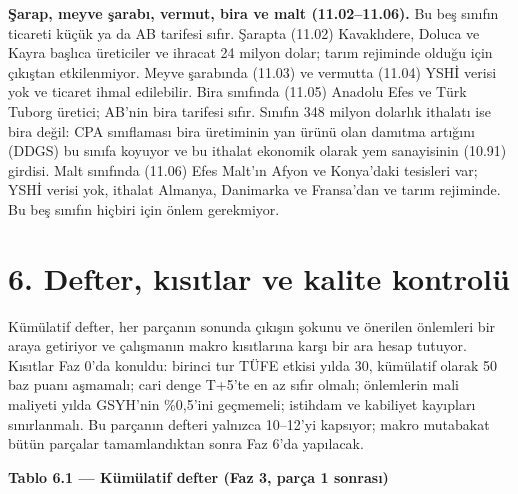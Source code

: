 \textbf{Şarap, meyve şarabı, vermut, bira ve malt (11.02--11.06).} Bu beş sınıfın ticareti küçük ya da AB tarifesi sıfır. Şarapta (11.02) Kavaklıdere, Doluca ve Kayra başlıca üreticiler \etiketH{} ve ihracat 24 milyon dolar; tarım rejiminde olduğu için çıkıştan etkilenmiyor. Meyve şarabında (11.03) ve vermutta (11.04) YSHİ verisi yok ve ticaret ihmal edilebilir. Bira sınıfında (11.05) Anadolu Efes ve Türk Tuborg üretici; AB'nin bira tarifesi sıfır. Sınıfın 348 milyon dolarlık ithalatı ise bira değil: CPA sınıflaması bira üretiminin yan ürünü olan damıtma artığını (DDGS) bu sınıfa koyuyor ve bu ithalat ekonomik olarak yem sanayisinin (10.91) girdisi. Malt sınıfında (11.06) Efes Malt'ın Afyon ve Konya'daki tesisleri var; YSHİ verisi yok, ithalat Almanya, Danimarka ve Fransa'dan ve tarım rejiminde. Bu beş sınıfın hiçbiri için önlem gerekmiyor.

\hypertarget{nace_kartlar_10-12-6-defter-kux131sux131tlar-ve-kalite-kontroluxfc}{%
\section{6. Defter, kısıtlar ve kalite kontrolü}\label{nace_kartlar_10-12-6-defter-kux131sux131tlar-ve-kalite-kontroluxfc}}

Kümülatif defter, her parçanın sonunda çıkışın şokunu ve önerilen önlemleri bir araya getiriyor ve çalışmanın makro kısıtlarına karşı bir ara hesap tutuyor. Kısıtlar Faz 0'da konuldu: birinci tur TÜFE etkisi yılda 30, kümülatif olarak 50 baz puanı aşmamalı; cari denge T+5'te en az sıfır olmalı; önlemlerin mali maliyeti yılda GSYH'nin \%0,5'ini geçmemeli; istihdam ve kabiliyet kayıpları sınırlanmalı. Bu parçanın defteri yalnızca 10--12'yi kapsıyor; makro mutabakat bütün parçalar tamamlandıktan sonra Faz 6'da yapılacak.


\textbf{Tablo 6.1 --- Kümülatif defter (Faz 3, parça 1 sonrası)}

\nopagebreak[4]

\begingroup\gbtablo\small

